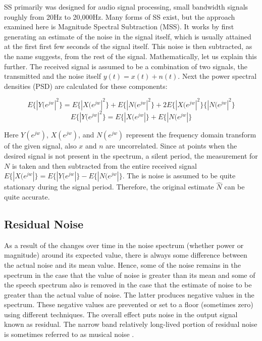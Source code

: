 SS primarily was designed for audio signal processing, small bandwidth signals roughly from 20Hz to 20,000Hz.  Many forms of SS exist, but the approach examined here is Magnitude Spectral Subtraction (MSS).  It works by first generating an estimate of the noise in the signal itself, which is usually attained at the first first few seconds of the signal itself.  This noise is then subtracted, as the name suggests, from the rest of the signal.  Mathematically, let us explain this further.  The received signal is assumed to be a combination of two signals, the transmitted and the noise itself \(y(t) = x(t) + n(t)\).  Next the power spectral densities (PSD) are calculated for these components:

\[ E\{|Y(e^{jw}|^{2}\}= E\{|X(e^{jw}|^{2}\} + E\{|N(e^{jw}|^{2}\} + 2E\{|X(e^{jw}|^{2}\}\{|N(e^{jw}|^{2}\}\]
\[ E\{|Y(e^{jw}|^{2}\}= E\{|X(e^{jw}|\} + E\{|N(e^{jw}|\}  \]

Here \(Y(e^{jw})\), \(X(e^{jw})\), and \(N(e^{jw})\) represent the frequency domain transform of the given signal, also \(x\) and \(n\) are uncorrelated.  Since at points when the desired signal is not present in the spectrum, a silent period, the measurement for \(N\) is taken and then subtracted from the entire received signal \(E\{|X(e^{jw}|\}= E\{|Y(e^{jw}|\} - E\{|N(e^{jw}|\}\).  The is noise is assumed to be quite stationary during the signal period.  Therefore, the original estimate \(\hat{N}\) can be quite accurate.\\

\subsection{Residual Noise}

As a result of the changes over time in the noise spectrum (whether power or magnitude) around its expected value, there is always some difference between the actual noise and its mean value. Hence, some of the noise remains in the spectrum in the case that the value of noise is greater than its mean and some of the speech spectrum also is removed in the case that the estimate of noise to be greater than the actual value of noise. The latter produces negative values in the spectrum. These negative values are prevented or set to a floor (sometimes zero) using different techniques. The overall effect puts noise in the output signal known as residual. The narrow band relatively long-lived portion of residual noise is sometimes referred to as musical noise \cite{TBD}.


